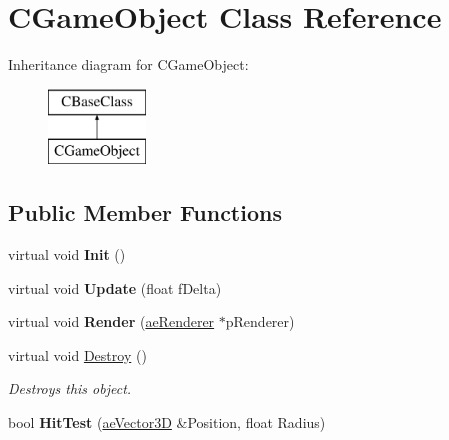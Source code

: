 \hypertarget{class_c_game_object}{}\section{C\+Game\+Object Class Reference}
\label{class_c_game_object}
Inheritance diagram for C\+Game\+Object\+:\begin{figure}[H]
\begin{center}
\leavevmode
\includegraphics[height=2.000000cm]{class_c_game_object}
\end{center}
\end{figure}
\subsection*{Public Member Functions}
\begin{DoxyCompactItemize}
\item 
virtual void {\bfseries Init} ()\hypertarget{class_c_game_object_aee6586c144cdbe215dfcf4399abef3e9}{}\label{class_c_game_object_aee6586c144cdbe215dfcf4399abef3e9}

\item 
virtual void {\bfseries Update} (float f\+Delta)\hypertarget{class_c_game_object_a03a384488babda616cf7b2c79b8f0942}{}\label{class_c_game_object_a03a384488babda616cf7b2c79b8f0942}

\item 
virtual void {\bfseries Render} (\hyperlink{classae_core_1_1ae_renderer}{ae\+Renderer} $\ast$p\+Renderer)\hypertarget{class_c_game_object_aedfc240a46a4f24e69ca86ae758a95b6}{}\label{class_c_game_object_aedfc240a46a4f24e69ca86ae758a95b6}

\item 
virtual void \hyperlink{class_c_game_object_a00e647512b58e1ce989267735a69777b}{Destroy} ()\hypertarget{class_c_game_object_a00e647512b58e1ce989267735a69777b}{}\label{class_c_game_object_a00e647512b58e1ce989267735a69777b}

\begin{DoxyCompactList}\small\item\em Destroys this object. \end{DoxyCompactList}\item 
bool {\bfseries Hit\+Test} (\hyperlink{structae_core_1_1ae_vector3_d}{ae\+Vector3D} \&Position, float Radius)\hypertarget{class_c_game_object_a87822e269532b9409437ecd08314e06f}{}\label{class_c_game_object_a87822e269532b9409437ecd08314e06f}

\end{DoxyCompactItemize}
